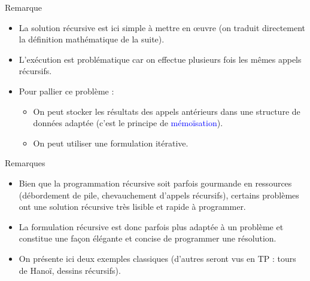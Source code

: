 \documentclass[10pt]{beamer}
\begin{document}
\begin{frame}[fragile]{\Ctitle}{\stitle}
	\begin{block}{Remarque}
		\begin{itemize}
			\item<1-> La solution récursive est ici simple à mettre en œuvre (on traduit directement la définition mathématique de la suite).
			\item<2-> L'exécution est problématique car on effectue plusieurs fois les mêmes appels récursifs.
			\item<3-> Pour pallier ce problème :
				\begin{itemize}
					\item<4-> On peut stocker les résultats des appels antérieurs dans une structure de données adaptée (c'est le principe de \textcolor{blue}{mémoïsation}).
					\item<5-> On peut utiliser une formulation itérative.
				\end{itemize}
		\end{itemize}
	\end{block}
\end{frame}

\begin{frame}[fragile]{\Ctitle}{\stitle}
	\begin{block}{Remarques}
		\begin{itemize}
			\item<1->Bien que la programmation récursive soit parfois gourmande en ressources (débordement de pile, chevauchement d'appels récursifs), certains problèmes ont une solution récursive très lisible et rapide à programmer.
			\item<2-> La formulation récursive est donc parfois \og{}plus adaptée\fg{} à un problème et constitue une façon \og{}élégante\fg{} et concise de programmer une résolution.
			\item<3-> On présente ici deux exemples classiques (d'autres seront vus en TP : tours de Hanoï, dessins récursifs).
		\end{itemize}
	\end{block}
\end{frame}
\end{document}
